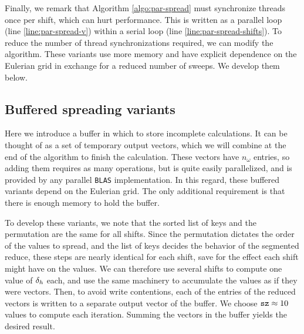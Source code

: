 Finally, we remark that Algorithm \ref{algo:par-spread} must synchronize threads once per
shift, which can hurt performance. This is written as a parallel loop (line
\ref{line:par-spread-v}) within a serial loop (line \ref{line:par-spread-shifts}). To
reduce the number of thread synchronizations required, we can modify the algorithm.
These variants use more memory and have explicit dependence on the Eulerian grid in
exchange for a reduced number of sweeps. We develop them below.

\subsection{Buffered spreading variants}

Here we introduce a buffer in which to store incomplete calculations. It can be thought
of as a set of temporary output vectors, which we will combine at the end of the
algorithm to finish the calculation. These vectors have $n_\omega$ entries, so adding
them requires as many operations, but is quite easily parallelized, and is provided by
any parallel \texttt{BLAS} implementation. In this regard, these buffered variants depend
on the Eulerian grid. The only additional requirement is that there is enough memory to
hold the buffer. 

To develop these variants, we note that the sorted list of keys and the permutation
are the same for all shifts. Since the permutation dictates the order of the values to
spread, and the list of keys decides the behavior of the segmented reduce, these steps
are nearly identical for each shift, save for the effect each shift might have on the
values. We can therefore use several shifts to compute one value of $\delta_h$ each, and
use the same machinery to accumulate the values as if they were vectors. Then, to avoid
write contentions, each of the entries of the reduced vectors is written to a separate
output vector of the buffer. We choose $\texttt{sz}\approx 10$ values to compute each
iteration. Summing the vectors in the buffer yields the desired result.

